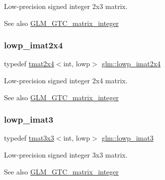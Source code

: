 Low-\/precision signed integer 2x3 matrix. \begin{DoxySeeAlso}{See also}
\hyperlink{group__gtc__matrix__integer}{G\+L\+M\+\_\+\+G\+T\+C\+\_\+matrix\+\_\+integer} 
\end{DoxySeeAlso}
\mbox{\label{group__gtc__matrix__integer_gaf664d339f1b66e62ed07c913e60be940}} 
\subsubsection{\texorpdfstring{lowp\+\_\+imat2x4}{lowp\_imat2x4}}
{\footnotesize\ttfamily typedef \hyperlink{structglm_1_1tmat2x4}{tmat2x4}$<$int, lowp$>$ \hyperlink{group__gtc__matrix__integer_gaf664d339f1b66e62ed07c913e60be940}{glm\+::lowp\+\_\+imat2x4}}

Low-\/precision signed integer 2x4 matrix. \begin{DoxySeeAlso}{See also}
\hyperlink{group__gtc__matrix__integer}{G\+L\+M\+\_\+\+G\+T\+C\+\_\+matrix\+\_\+integer} 
\end{DoxySeeAlso}
\mbox{\label{group__gtc__matrix__integer_ga2f7d17630aa9e27bb9e62f98603a4d7e}} 
\subsubsection{\texorpdfstring{lowp\+\_\+imat3}{lowp\_imat3}}
{\footnotesize\ttfamily typedef \hyperlink{structglm_1_1tmat3x3}{tmat3x3}$<$int, lowp$>$ \hyperlink{group__gtc__matrix__integer_ga2f7d17630aa9e27bb9e62f98603a4d7e}{glm\+::lowp\+\_\+imat3}}

Low-\/precision signed integer 3x3 matrix. \begin{DoxySeeAlso}{See also}
\hyperlink{group__gtc__matrix__integer}{G\+L\+M\+\_\+\+G\+T\+C\+\_\+matrix\+\_\+integer} 
\end{DoxySeeAlso}
\mbox{\label{group__gtc__matrix__integer_ga93514d2df726334e6d5edd373635d343}} 
